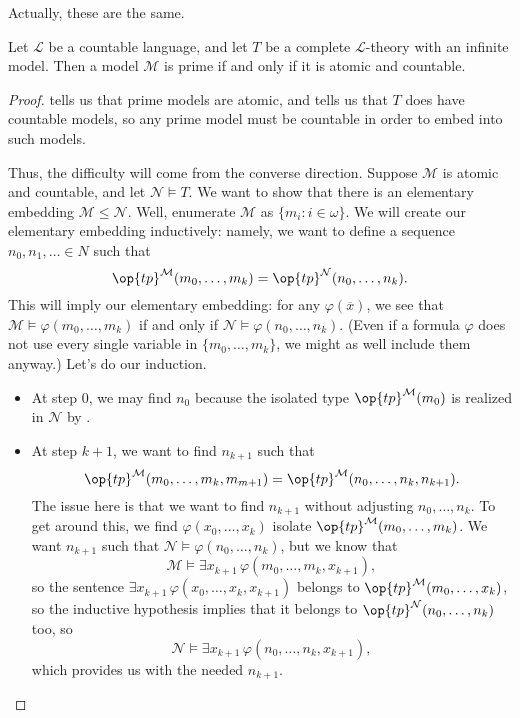 \documentclass[../notes.tex]{subfiles}
\begin{document}
Actually, these are the same.
\begin{proposition} \label{prop:prime-is-atomic}
	Let $\mathcal L$ be a countable language, and let $T$ be a complete $\mathcal L$-theory with an infinite model. Then a model $\mathcal M$ is prime if and only if it is atomic and countable.
\end{proposition}
\begin{proof}
	 tells us that prime models are atomic, and  tells us that $T$ does have countable models, so any prime model must be countable in order to embed into such models.
	
	Thus, the difficulty will come from the converse direction. Suppose $\mathcal M$ is atomic and countable, and let $\mathcal N\models T$. We want to show that there is an elementary embedding $\mathcal M\le\mathcal N$. Well, enumerate $\mathcal M$ as $\{m_i:i\in\omega\}$. We will create our elementary embedding inductively: namely, we want to define a sequence $n_0,n_1,\ldots\in N$ such that
	\[\op{tp}^{\mathcal M}(m_0,\ldots,m_k)=\op{tp}^{\mathcal N}(n_0,\ldots,n_k).\]
	This will imply our elementary embedding: for any $\varphi(\overline x)$, we see that $\mathcal M\models\varphi(m_0,\ldots,m_k)$ if and only if $\mathcal N\models\varphi(n_0,\ldots,n_k)$. (Even if a formula $\varphi$ does not use every single variable in $\{m_0,\ldots,m_k\}$, we might as well include them anyway.) Let's do our induction.
	\begin{itemize}
		\item At step $0$, we may find $n_0$ because the isolated type $\op{tp}^{\mathcal M}(m_0)$ is realized in $\mathcal N$ by .
		\item At step $k+1$, we want to find $n_{k+1}$ such that
		\[\op{tp}^{\mathcal M}(m_0,\ldots,m_k,m_{m+1})=\op{tp}^{\mathcal M}(n_0,\ldots,n_k,n_{k+1}).\]
		The issue here is that we want to find $n_{k+1}$ without adjusting $n_0,\ldots,n_k$. To get around this, we find $\varphi(x_0,\ldots,x_k)$ isolate $\op{tp}^{\mathcal M}(m_0,\ldots,m_k)$. We want $n_{k+1}$ such that $\mathcal N\models\varphi(n_0,\ldots,n_k)$, but we know that
		\[\mathcal M\models\exists x_{k+1}\,\varphi(m_0,\ldots,m_k,x_{k+1}),\]
		so the sentence $\exists x_{k+1}\,\varphi(x_0,\ldots,x_k,x_{k+1})$ belongs to $\op{tp}^{\mathcal M}(m_0,\ldots,x_k)$, so the inductive hypothesis implies that it belongs to $\op{tp}^{\mathcal N}(n_0,\ldots,n_k)$ too, so
		\[\mathcal N\models\exists x_{k+1}\,\varphi(n_0,\ldots,n_k,x_{k+1}),\]
		which provides us with the needed $n_{k+1}$.
		\qedhere
	\end{itemize}
\end{proof}
\end{document}
